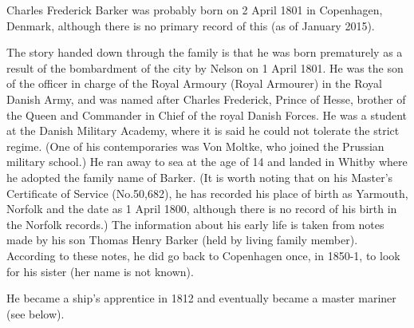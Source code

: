 
Charles Frederick Barker was probably born on 2 April 1801 in Copenhagen, Denmark, although there is no primary record of this (as of January 2015).

The story handed down through the family is that he was born prematurely as a result of the bombardment of the city by Nelson on 1 April 1801. He was the son of the officer in charge of the Royal Armoury (Royal Armourer) in the Royal Danish Army, and was named after Charles Frederick, Prince of Hesse, brother of the Queen and Commander in Chief of the royal Danish Forces. He was a student at the Danish Military Academy, where it is said he could not tolerate the strict regime. (One of his contemporaries was Von Moltke, who joined the Prussian military school.) He ran away to sea at the age of 14 and landed in Whitby where he adopted the family name of Barker. (It is worth noting that on his Master's Certificate of Service (No.50,682), he has recorded his place of birth as Yarmouth, Norfolk and the date as 1 April 1800, although there is no record of his birth in the Norfolk records.) The information about his early life is taken from notes made by his son Thomas Henry Barker (held by living family member). According to these notes, he did go back to Copenhagen once, in 1850-1, to look for his sister (her name is not known).

He became a ship's apprentice in 1812 \cite{CFBShipList} and eventually became a master mariner (see below).

